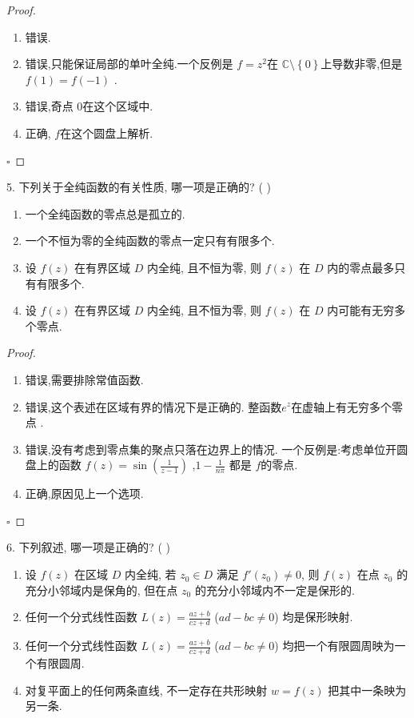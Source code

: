 \documentclass[../../复变函数.tex]{subfiles}
\begin{document}
\begin{proof}
    \begin{enumerate}
        \item 错误.
        \item 错误,只能保证局部的单叶全纯.一个反例是 \(  f= z^{2}  \)在 \(  \mathbb{C} \setminus \left\{ 0 \right\}  \)上导数非零,但是 \(  f\left( 1 \right)= f\left( -1 \right)    \) .
        \item 错误,奇点 \(  0  \)在这个区域中.  
        \item 正确, \(  f  \)在这个圆盘上解析. 
    \end{enumerate}
    

    \hfill $\square$
\end{proof}
\begin{problem}
5. 下列关于全纯函数的有关性质, 哪一项是正确的? ( )
\begin{enumerate}
    \item 一个全纯函数的零点总是孤立的.
    \item 一个不恒为零的全纯函数的零点一定只有有限多个.
    \item 设 $f(z)$ 在有界区域 $D$ 内全纯, 且不恒为零, 则 $f(z)$ 在 $D$ 内的零点最多只有有限多个.
    \item 设 $f(z)$ 在有界区域 $D$ 内全纯, 且不恒为零, 则 $f(z)$ 在 $D$ 内可能有无穷多个零点.
\end{enumerate}
\end{problem}
\begin{proof}
    \begin{enumerate}
        \item 错误,需要排除常值函数.
        \item 错误,这个表述在区域有界的情况下是正确的. 整函数\(  e^{z}  \)在虚轴上有无穷多个零点 .
        \item 错误,没有考虑到零点集的聚点只落在边界上的情况. 一个反例是:考虑单位开圆盘上的函数 \(  f\left( z \right) = \sin \left( \frac{1 }{z-1 }  \right)   \) ,\(  1-\frac{1 }{n\pi  }   \) 都是 \(  f  \)的零点.
        \item 正确,原因见上一个选项.
    \end{enumerate}
    

    \hfill $\square$
\end{proof}
\begin{problem}
6. 下列叙述, 哪一项是正确的? ( )
\begin{enumerate}
    \item 设 $f(z)$ 在区域 $D$ 内全纯, 若 $z_0 \in D$ 满足 $f'(z_0) \ne 0$, 则 $f(z)$ 在点 $z_0$ 的充分小邻域内是保角的, 但在点 $z_0$ 的充分小邻域内不一定是保形的.
    \item 任何一个分式线性函数 $L(z) = \frac{az+b}{cz+d}$ ($ad-bc \ne 0$) 均是保形映射.
    \item 任何一个分式线性函数 $L(z) = \frac{az+b}{cz+d}$ ($ad-bc \ne 0$) 均把一个有限圆周映为一个有限圆周.
    \item 对复平面上的任何两条直线, 不一定存在共形映射 $w = f(z)$ 把其中一条映为另一条.
\end{enumerate}
\end{problem}
\end{document}
